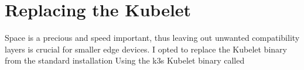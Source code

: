 \section{Replacing the Kubelet}
Space is a precious and speed important, thus leaving out unwanted compatibility layers is crucial for smaller edge devices. I opted to replace the Kubelet binary from the standard installation 
Using the k3s Kubelet binary called 